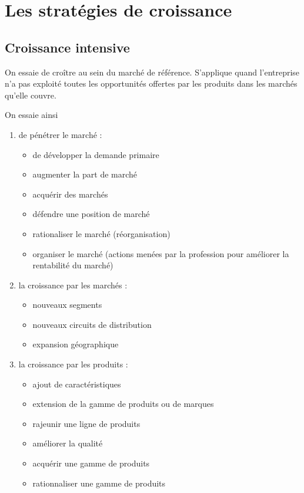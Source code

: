 	\section{Les stratégies de croissance}
		
		\subsection{Croissance intensive}
		
		On essaie de croître au sein du marché de référence. S'applique quand l'entreprise n'a pas exploité toutes les opportunités offertes par les produits dans les marchés qu'elle couvre.
		
		
		On essaie ainsi
		
		\begin{enumerate}
			\item de pénétrer le marché :		
			\begin{itemize}
				\item de développer la demande primaire
				\item augmenter la part de marché
				\item acquérir des marchés
				\item défendre une position de marché
				\item rationaliser le marché (réorganisation)
				\item organiser le marché (actions menées par la profession pour améliorer la rentabilité du marché)
			\end{itemize}
			
			\item la croissance par les marchés :
			
			\begin{itemize}
				\item nouveaux segments
				\item nouveaux circuits de distribution
				\item expansion géographique
			\end{itemize}
			\item la croissance par les produits :
			
			\begin{itemize}
				\item ajout de caractéristiques
				\item extension de la gamme de produits ou de marques
				\item rajeunir une ligne de produits
				\item améliorer la qualité
				\item acquérir une gamme de produits
				\item rationnaliser une gamme de produits
			\end{itemize}
		\end{enumerate}
		

